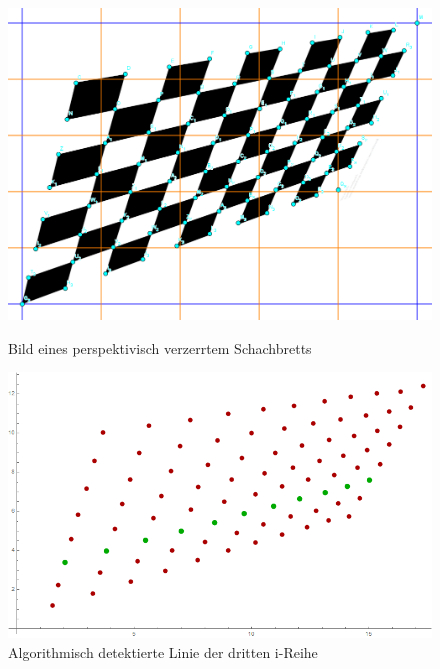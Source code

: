 \begin{figure}[!htb]
	\includegraphics[width=\linewidth]{images/perspektivisch.png}
	\caption{Bild eines perspektivisch verzerrtem Schachbretts}
	\label{fig:awesome_image1}
	\endminipage\hfill
	\includegraphics[width=\linewidth]{images/AlgPerspektifisch.png}
	\caption{Algorithmisch detektierte Linie der dritten i-Reihe}
	\label{fig:awesome_image2}
	\endminipage\hfill
\end{figure}


